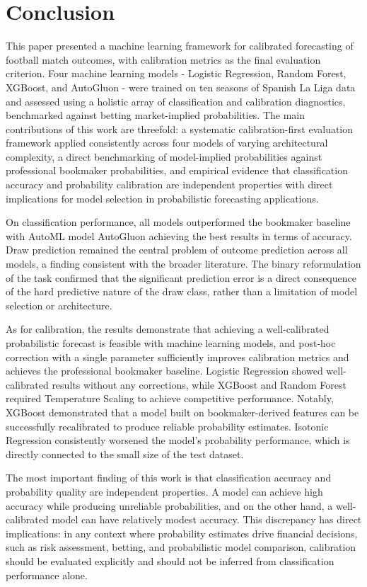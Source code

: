 \documentclass[conference]{IEEEtran}
\begin{document}
\section{Conclusion}
This paper presented a machine learning framework for
calibrated forecasting of football match outcomes, with
calibration metrics as the final evaluation criterion. Four
machine learning models - Logistic Regression, Random
Forest, XGBoost, and AutoGluon - were trained on ten
seasons of Spanish La Liga data and assessed using a holistic
array of classification and calibration diagnostics,
benchmarked against betting market-implied probabilities.
The main contributions of this work are threefold: a
systematic calibration-first evaluation framework applied
consistently across four models of varying architectural
complexity, a direct benchmarking of model-implied
probabilities against professional bookmaker probabilities,
and empirical evidence that classification accuracy and
probability calibration are independent properties with
direct implications for model selection in probabilistic
forecasting applications.

On classification performance, all models outperformed the
bookmaker baseline with AutoML model AutoGluon achieving the
best results in terms of accuracy. Draw prediction remained
the central problem of outcome prediction across all models,
a finding consistent with the broader literature. The binary
reformulation of the task confirmed that the significant
prediction error is a direct consequence of the hard
predictive nature of the draw class, rather than a limitation
of model selection or architecture.

As for calibration, the results demonstrate that achieving a
well-calibrated probabilistic forecast is feasible with
machine learning models, and post-hoc correction with a
single parameter sufficiently improves calibration metrics
and achieves the professional bookmaker baseline. Logistic
Regression showed well-calibrated results without any
corrections, while XGBoost and Random Forest required
Temperature Scaling to achieve competitive performance.
Notably, XGBoost demonstrated that a model built on
bookmaker-derived features can be successfully recalibrated
to produce reliable probability estimates.
Isotonic Regression consistently worsened the model's
probability performance, which is directly connected to the
small size of the test dataset.

The most important finding of this work is that
classification accuracy and probability quality are
independent properties. A model can achieve high accuracy
while producing unreliable probabilities, and on the other
hand, a well-calibrated model can have relatively modest
accuracy. This discrepancy has direct implications: in any
context where probability estimates drive financial
decisions, such as risk assessment, betting, and
probabilistic model comparison, calibration should be
evaluated explicitly and should not be inferred from
classification performance alone.
\end{document}
